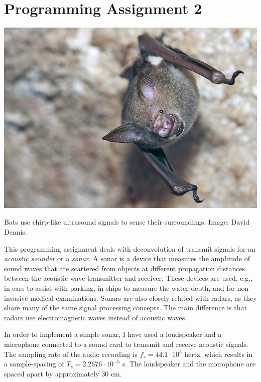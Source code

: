 \chapter{Programming Assignment 2}

\begin{marginfigure}[5cm]
  \begin{center}
    \includegraphics[width=\textwidth]{Assignments/figures/bat.jpg}
  \end{center}
  \caption{Bats use chirp-like ultrasound signals to sense their surroundings. Image: David Dennis.}
  \label{fig:bat_image}
\end{marginfigure}

This programming assignment deals with deconvolution of transmit
signals for an \emph{acoustic sounder} or a \emph{sonar}. A sonar is
a device that measures the amplitude of sound waves that are scattered
from objects at different propagation distances between the acoustic
wave transmitter and receiver. These devices are used, e.g., in cars to
assist with parking, in ships to measure the water depth, and for
non-invasive medical examinations. Sonars are also closely related
with radars, as they share many of the same signal processing
concepts. The main difference is that radars use electromagnetic waves
instead of acoustic waves.

In order to implement a simple sonar, I have used a loudspeaker and a
microphone connected to a sound card to transmit and receive acoustic
signals. The sampling rate of the audio recording is $f_s=44.1\cdot
10^3$ hertz, which results in a sample-spacing of $T_s=2.2676\cdot
10^{-5}$ s. The loudspeaker and the microphone are spaced apart by
approximately 30 cm.
 
